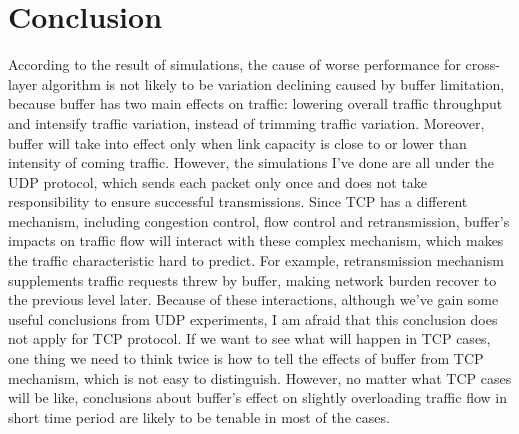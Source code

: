 \documentclass[a4paper]{article}
\begin{document}
\newpage
\section{Conclusion}
\label{sec:conclusion}
According to the result of simulations, the cause of worse performance for cross-layer algorithm is not likely to be variation declining caused by buffer limitation, because buffer has two main effects on traffic: lowering overall traffic throughput and intensify traffic variation, instead of trimming traffic variation.  Moreover, buffer will take into effect only when link capacity is close to or lower than intensity of coming traffic. However, the simulations I've done are all under the UDP protocol, which sends each packet only once and does not take responsibility to ensure successful transmissions. Since TCP has a different mechanism, including congestion control, flow control and retransmission, buffer's impacts on traffic flow will interact with these complex mechanism, which makes the traffic characteristic hard to predict. For example, retransmission mechanism supplements traffic requests threw by buffer, making network burden recover to the previous level later. Because of these interactions, although we've gain some useful conclusions from UDP experiments,  I am afraid that this conclusion does not apply for TCP protocol. If we want to see what will happen in TCP cases, one thing we need to think twice is how to tell the effects of buffer from TCP mechanism, which is not easy to distinguish. However, no matter what TCP cases will be like, conclusions about buffer's effect on slightly overloading traffic flow in short time period are likely to be tenable in most of the cases.
\end{document}
